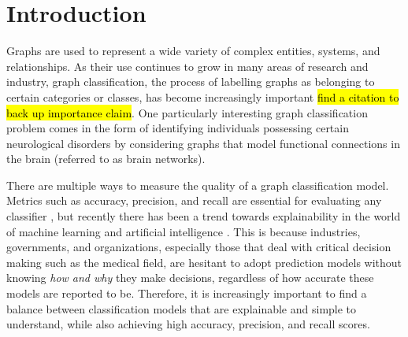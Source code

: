 \documentclass[sigconf]{acmart}
\begin{document}



\maketitle

\section{Introduction} \label{intro}

Graphs are used to represent a wide variety of complex entities, systems, and relationships.
As their use continues to grow in many areas of research and industry, graph classification, the process of labelling graphs as belonging to certain categories or classes, has become increasingly important \hl{find a citation to back up importance claim}.
One particularly interesting graph classification problem comes in the form of identifying individuals possessing certain neurological disorders by considering graphs that model functional connections in the brain (referred to as brain networks).

There are multiple ways to measure the quality of a graph classification model.
Metrics such as accuracy, precision, and recall are essential for evaluating any classifier \cite{elkan2012}, but recently there has been a trend towards explainability in the world of machine learning and artificial intelligence \cite{hassan2021,linardatos2020}.
This is because industries, governments, and organizations, especially those that deal with critical decision making such as the medical field, are hesitant to adopt prediction models without knowing \emph{how and why} they make decisions, regardless of how accurate these models are reported to be.
Therefore, it is increasingly important to find a balance between classification models that are explainable and simple to understand, while also achieving high accuracy, precision, and recall scores.
\end{document}

